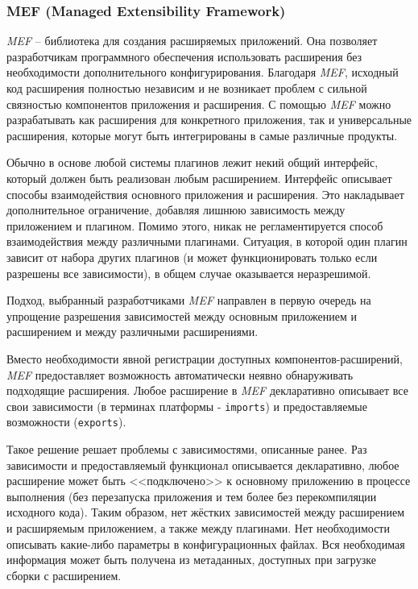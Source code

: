 \subsubsection{MEF (Managed Extensibility Framework)}

{\it MEF} -- библиотека для создания расширяемых приложений. Она позволяет разработчикам программного обеспечения использовать расширения без необходимости дополнительного конфигурирования. Благодаря {\it MEF}, исходный код расширения полностью независим и не возникает проблем с сильной связностью компонентов приложения и расширения. С помощью {\it MEF} можно разрабатывать как расширения для конкретного приложения, так и универсальные расширения, которые могут быть интегрированы в самые различные продукты.

Обычно в основе любой системы плагинов лежит некий общий интерфейс, который должен быть реализован любым расширением. Интерфейс описывает способы взаимодействия основного приложения и расширения. Это накладывает дополнительное ограничение, добавляя лишнюю зависимость между приложением и плагином. Помимо этого, никак не регламентируется способ взаимодействия между различными плагинами. Ситуация, в которой один плагин зависит от набора других плагинов (и может функционировать только если разрешены все зависимости), в общем случае оказывается неразрешимой.

Подход, выбранный разработчиками {\it MEF} направлен в первую очередь на упрощение разрешения зависимостей между основным приложением и расширением и между различными расширениями.

Вместо необходимости явной регистрации доступных компонентов-расширений, {\it MEF} предоставляет возможность автоматически неявно обнаруживать подходящие расширения. Любое расширение в {\it MEF} декларативно описывает все свои зависимости (в терминах платформы - {\tt imports}) и предоставляемые возможности ({\tt exports}).

Такое решение решает проблемы с зависимостями, описанные ранее. Раз зависимости и предоставляемый функционал описывается декларативно, любое расширение может быть <<подключено>> к основному приложению в процессе выполнения (без перезапуска приложения и тем более без перекомпиляции исходного кода). Таким образом, нет жёстких зависимостей между расширением и расширяемым приложением, а также между плагинами. Нет необходимости описывать какие-либо параметры в конфигурационных файлах. Вся необходимая информация может быть получена из метаданных, доступных при загрузке сборки с расширением.

